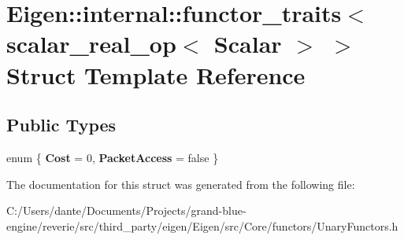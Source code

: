 \hypertarget{struct_eigen_1_1internal_1_1functor__traits_3_01scalar__real__op_3_01_scalar_01_4_01_4}{}\section{Eigen\+::internal\+::functor\+\_\+traits$<$ scalar\+\_\+real\+\_\+op$<$ Scalar $>$ $>$ Struct Template Reference}
\label{struct_eigen_1_1internal_1_1functor__traits_3_01scalar__real__op_3_01_scalar_01_4_01_4}
\subsection*{Public Types}
\begin{DoxyCompactItemize}
\item 
\mbox{\label{struct_eigen_1_1internal_1_1functor__traits_3_01scalar__real__op_3_01_scalar_01_4_01_4_a8b2cbb7abd946198cfe0839c6eeb0d78}} 
enum \{ {\bfseries Cost} = 0, 
{\bfseries Packet\+Access} = false
 \}
\end{DoxyCompactItemize}


The documentation for this struct was generated from the following file\+:\begin{DoxyCompactItemize}
\item 
C\+:/\+Users/dante/\+Documents/\+Projects/grand-\/blue-\/engine/reverie/src/third\+\_\+party/eigen/\+Eigen/src/\+Core/functors/Unary\+Functors.\+h\end{DoxyCompactItemize}
